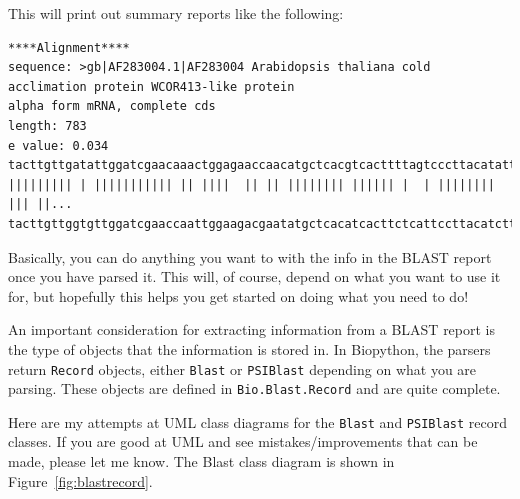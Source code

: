 \documentclass{report}
\begin{document}
This will print out summary reports like the following:

\begin{verbatim}
****Alignment****
sequence: >gb|AF283004.1|AF283004 Arabidopsis thaliana cold acclimation protein WCOR413-like protein
alpha form mRNA, complete cds
length: 783
e value: 0.034
tacttgttgatattggatcgaacaaactggagaaccaacatgctcacgtcacttttagtcccttacatattcctc...
||||||||| | ||||||||||| || ||||  || || |||||||| |||||| |  | |||||||| ||| ||...
tacttgttggtgttggatcgaaccaattggaagacgaatatgctcacatcacttctcattccttacatcttcttc...
\end{verbatim}

Basically, you can do anything you want to with the info in the BLAST
report once you have parsed it. This will, of course, depend on what
you want to use it for, but hopefully this helps you get started on
doing what you need to do!

An important consideration for extracting information from a BLAST report is the type of objects that the information is stored in. In Biopython, the parsers return \verb|Record| objects, either \verb|Blast| or \verb|PSIBlast| depending on what you are parsing. These objects are defined in \verb|Bio.Blast.Record| and are quite complete.


Here are my attempts at UML class diagrams for the \verb|Blast| and \verb|PSIBlast| record classes. If you are good at UML and see mistakes/improvements that can be made, please let me know. The Blast class diagram is shown in Figure~\ref{fig:blastrecord}.

\begin{htmlonly}
\label{fig:blastrecord}
\end{htmlonly}
\end{document}
